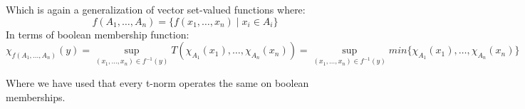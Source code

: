 Which is again a generalization of vector set-valued functions where: $$f(A_1,\ldots,A_n)= \{f(x_1,\ldots,x_n)\mid x_i\in A_i\}$$
In terms of boolean membership function:
$$\chi _{f(A_1,\ldots,A_n)}(y)=\sup_{(x_1,\ldots,x_n)\in f^{-1}(y)}T(\chi_{A_1}(x_1),\ldots,\chi_{A_n}(x_n)) = \sup_{(x_1,\ldots,x_n)\in f^{-1}(y)}min\{\chi_{A_1}(x_1),\ldots,\chi_{A_n}(x_n)\}$$

Where we have used that every t-norm operates the same on boolean memberships.\\


